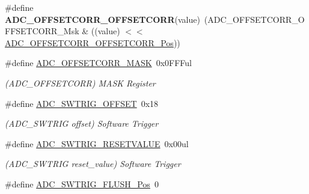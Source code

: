 \begin{DoxyCompactItemize}
\item 
\hypertarget{group___s_a_m_l21___a_d_c_gaf8373c528bbc4236f2d148951e3f07b5}{}\#define {\bfseries A\+D\+C\+\_\+\+O\+F\+F\+S\+E\+T\+C\+O\+R\+R\+\_\+\+O\+F\+F\+S\+E\+T\+C\+O\+R\+R}(value)~(A\+D\+C\+\_\+\+O\+F\+F\+S\+E\+T\+C\+O\+R\+R\+\_\+\+O\+F\+F\+S\+E\+T\+C\+O\+R\+R\+\_\+\+Msk \& ((value) $<$$<$ \hyperlink{group___s_a_m_l21___a_d_c_ga9b51f7b2fce4e38ea6e2f545e8200cb0}{A\+D\+C\+\_\+\+O\+F\+F\+S\+E\+T\+C\+O\+R\+R\+\_\+\+O\+F\+F\+S\+E\+T\+C\+O\+R\+R\+\_\+\+Pos}))\label{group___s_a_m_l21___a_d_c_gaf8373c528bbc4236f2d148951e3f07b5}

\item 
\hypertarget{group___s_a_m_l21___a_d_c_ga4bbf04117204f10dd4495be1929b4759}{}\#define \hyperlink{group___s_a_m_l21___a_d_c_ga4bbf04117204f10dd4495be1929b4759}{A\+D\+C\+\_\+\+O\+F\+F\+S\+E\+T\+C\+O\+R\+R\+\_\+\+M\+A\+S\+K}~0x0\+F\+F\+Ful\label{group___s_a_m_l21___a_d_c_ga4bbf04117204f10dd4495be1929b4759}

\begin{DoxyCompactList}\small\item\em (A\+D\+C\+\_\+\+O\+F\+F\+S\+E\+T\+C\+O\+R\+R) M\+A\+S\+K Register \end{DoxyCompactList}\item 
\hypertarget{group___s_a_m_l21___a_d_c_ga31069581e8251f1eeffcb1933288b927}{}\#define \hyperlink{group___s_a_m_l21___a_d_c_ga31069581e8251f1eeffcb1933288b927}{A\+D\+C\+\_\+\+S\+W\+T\+R\+I\+G\+\_\+\+O\+F\+F\+S\+E\+T}~0x18\label{group___s_a_m_l21___a_d_c_ga31069581e8251f1eeffcb1933288b927}

\begin{DoxyCompactList}\small\item\em (A\+D\+C\+\_\+\+S\+W\+T\+R\+I\+G offset) Software Trigger \end{DoxyCompactList}\item 
\hypertarget{group___s_a_m_l21___a_d_c_ga49c6b5f14c508b44648ebbd35407257a}{}\#define \hyperlink{group___s_a_m_l21___a_d_c_ga49c6b5f14c508b44648ebbd35407257a}{A\+D\+C\+\_\+\+S\+W\+T\+R\+I\+G\+\_\+\+R\+E\+S\+E\+T\+V\+A\+L\+U\+E}~0x00ul\label{group___s_a_m_l21___a_d_c_ga49c6b5f14c508b44648ebbd35407257a}

\begin{DoxyCompactList}\small\item\em (A\+D\+C\+\_\+\+S\+W\+T\+R\+I\+G reset\+\_\+value) Software Trigger \end{DoxyCompactList}\item 
\hypertarget{group___s_a_m_l21___a_d_c_ga5b316b5ec857239352dbb1c1701bacc2}{}\#define \hyperlink{group___s_a_m_l21___a_d_c_ga5b316b5ec857239352dbb1c1701bacc2}{A\+D\+C\+\_\+\+S\+W\+T\+R\+I\+G\+\_\+\+F\+L\+U\+S\+H\+\_\+\+Pos}~0\label{group___s_a_m_l21___a_d_c_ga5b316b5ec857239352dbb1c1701bacc2}


\end{DoxyCompactItemize}
